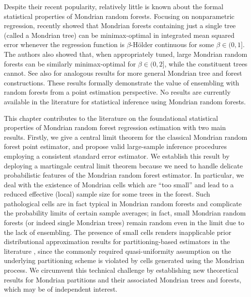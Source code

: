 \documentclass[11pt,lof]{puthesis}
\theoremstyle{break}
\theoremstyle{proof}
\begin{document}
Despite their recent popularity, relatively little is known about the formal
statistical properties of Mondrian random forests. Focusing on nonparametric
regression, \citet{mourtada2020minimax} recently showed that Mondrian forests
containing just a single tree (called a Mondrian tree) can be minimax-optimal
in integrated mean squared error whenever the regression function is
$\beta$-H{\"o}lder continuous for some $\beta \in (0, 1]$. The authors also
showed that, when appropriately tuned, large Mondrian random forests can be
similarly minimax-optimal for $\beta \in (0, 2]$, while the constituent trees
cannot. See also \citet{oreilly2022stochastic} for analogous results for more
general
Mondrian tree and forest constructions. These results formally demonstrate the
value of ensembling with random forests from a point estimation perspective. No
results are currently available in the literature for statistical inference
using Mondrian random forests.

This chapter contributes to the literature on the foundational statistical
properties of Mondrian random forest regression estimation with two main
results. Firstly, we give a central limit theorem for the classical Mondrian
random forest point estimator, and propose valid large-sample inference
procedures employing a consistent standard error estimator. We establish this
result by deploying a martingale central limit theorem
\citep[Theorem~3.2]{hall1980martingale} because we need to handle delicate
probabilistic features of the Mondrian random forest estimator. In particular,
we deal with the existence of Mondrian cells which are ``too small'' and lead
to a reduced effective (local) sample size for some trees in the forest. Such
pathological cells are in fact typical in Mondrian random forests and
complicate the probability limits of certain sample averages; in fact, small
Mondrian random forests (or indeed single Mondrian trees) remain random even
in the limit due to the lack of ensembling. The presence of small cells
renders inapplicable prior distributional approximation results for
partitioning-based estimators in the literature
\citep{huang2003local,cattaneo2020large}, since the commonly required
quasi-uniformity assumption on the underlying partitioning scheme is violated
by cells generated using the Mondrian process. We circumvent this
technical challenge by establishing new theoretical results for Mondrian
partitions and their associated Mondrian trees and forests, which may be of
independent interest.
\end{document}
